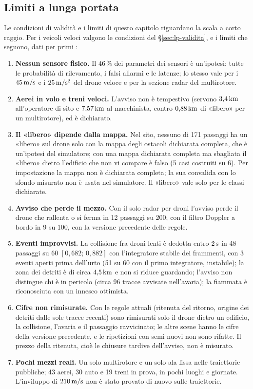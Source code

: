 \subsection{Limiti a lunga portata}\label{sec:lim-lunga}

Le condizioni di validità e i limiti di questo capitolo riguardano la scala a corto raggio. Per i veicoli veloci valgono le condizioni del \S\ref{sec:lp-validita}, e i limiti che seguono, dati per primi :
\begin{enumerate}[label=L\arabic*.,leftmargin=2.2em]
\item \textbf{Nessun sensore fisico.} Il $46\,\%$ dei parametri dei sensori è un'ipotesi: tutte le probabilità di rilevamento, i falsi allarmi e le latenze; lo stesso vale per i $45\,\mathrm{m/s}$ e i $25\,\mathrm{m/s^2}$ del drone veloce e per la sezione radar del multirotore.
\item \textbf{Aerei in volo e treni veloci.} L'avviso non è tempestivo (servono $3{,}4\,\mathrm{km}$ all'operatore di sito e $7{,}57\,\mathrm{km}$ al macchinista, contro $0{,}88\,\mathrm{km}$ di «libero» per un multirotore), ed è dichiarato.
\item \textbf{Il «libero» dipende dalla mappa.} Nel sito, nessuno di 171 passaggi ha un «libero» sul drone solo con la mappa degli ostacoli dichiarata completa, che è un'ipotesi del simulatore; con una mappa dichiarata completa ma sbagliata il «libero» dietro l'edificio che non vi compare è falso (5 casi costruiti su 6). Per impostazione la mappa non è dichiarata completa; la sua convalida con lo sfondo misurato non è usata nel simulatore. Il «libero» vale solo per le classi dichiarate.
\item \textbf{Avviso che perde il mezzo.} Con il solo radar per droni l'avviso perde il drone che rallenta o si ferma in 12 passaggi su 200; con il filtro Doppler a bordo in 9 su 100, con la versione precedente delle regole.
\item \textbf{Eventi improvvisi.} La collisione fra droni lenti è dedotta entro $2\,\mathrm{s}$ in 48 passaggi su 60 $[0{,}682;\,0{,}882]$ con l'integratore stabile dei frammenti, con 3 eventi aperti prima dell'urto (51 su 60 con il primo integratore, instabile); la zona dei detriti è di circa $4{,}5\,\mathrm{km}$ e non si riduce guardando; l'avviso non distingue chi è in pericolo (circa 96 tracce avvisate nell'avaria); la fiammata è riconosciuta con un innesco ottimista.
\item \textbf{Cifre non rimisurate.} Con le regole attuali (ritenuta del ritorno, origine dei detriti dalle sole tracce recenti) sono rimisurati solo il drone dietro un edificio, la collisione, l'avaria e il passaggio ravvicinato; le altre scene hanno le cifre della versione precedente, e le ripetizioni con semi nuovi non sono rifatte. Il prezzo della ritenuta, cioè le chiusure tardive dell'avviso, non è misurato.
\item \textbf{Pochi mezzi reali.} Un solo multirotore e un solo ala fissa nelle traiettorie pubbliche; 43 aerei, 30 auto e 19 treni in prova, in pochi luoghi e giornate. L'inviluppo di $210\,\mathrm{m/s}$ non è stato provato di nuovo sulle traiettorie.
\end{enumerate}

